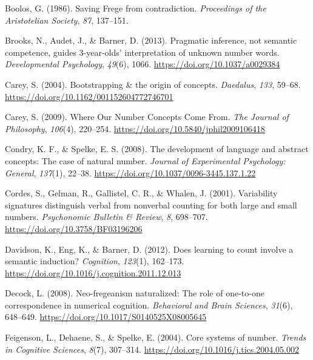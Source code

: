 \documentclass[10pt, letterpaper]{article}
\newenvironment{CSLReferences}%
  {}%
  {\par}
\begin{document}
\hypertarget{refs}{}
\begin{CSLReferences}
\leavevmode{}%
Boolos, G. (1986). Saving {Frege} from contradiction. \emph{Proceedings
of the Aristotelian Society}, \emph{87}, 137--151.

\leavevmode{}%
Brooks, N., Audet, J., \& Barner, D. (2013). Pragmatic inference, not
semantic competence, guides 3-year-olds' interpretation of unknown
number words. \emph{Developmental Psychology}, \emph{49}(6), 1066.
\url{https://doi.org/10.1037/a0029384}

\leavevmode{}%
Carey, S. (2004). Bootstrapping \& the origin of concepts.
\emph{Daedalus}, \emph{133}, 59--68.
\url{https://doi.org/10.1162/001152604772746701}

\leavevmode{}%
Carey, S. (2009). Where {Our} {Number} {Concepts} {Come} {From}.
\emph{The Journal of Philosophy}, \emph{106}(4), 220--254.
\url{https://doi.org/10.5840/jphil2009106418}

\leavevmode{}%
Condry, K. F., \& Spelke, E. S. (2008). The development of language and
abstract concepts: {The} case of natural number. \emph{Journal of
Experimental Psychology: General}, \emph{137}(1), 22--38.
\url{https://doi.org/10.1037/0096-3445.137.1.22}

\leavevmode{}%
Cordes, S., Gelman, R., Gallistel, C. R., \& Whalen, J. (2001).
Variability signatures distinguish verbal from nonverbal counting for
both large and small numbers. \emph{Psychonomic Bulletin \& Review},
\emph{8}, 698--707. \url{https://doi.org/10.3758/BF03196206}

\leavevmode{}%
Davidson, K., Eng, K., \& Barner, D. (2012). Does learning to count
involve a semantic induction? \emph{Cognition}, \emph{123}(1), 162--173.
\url{https://doi.org/10.1016/j.cognition.2011.12.013}

\leavevmode{}%
Decock, L. (2008). Neo-fregeanism naturalized: The role of one-to-one
correspondence in numerical cognition. \emph{Behavioral and Brain
Sciences}, \emph{31}(6), 648--649.
\url{https://doi.org/10.1017/S0140525X08005645}

\leavevmode{}%
Feigenson, L., Dehaene, S., \& Spelke, E. (2004). Core systems of
number. \emph{Trends in Cognitive Sciences}, \emph{8}(7), 307--314.
\url{https://doi.org/10.1016/j.tics.2004.05.002}


\end{CSLReferences}
\end{document}
